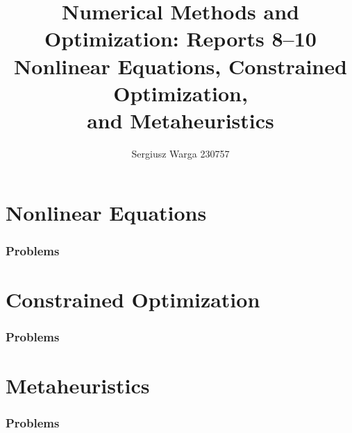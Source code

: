 \documentclass[a4paper]{article}
\title{%
  {\LARGE Numerical Methods and Optimization: Reports 8--10}\\[0.4em]
  {\large Nonlinear Equations,
    Constrained Optimization,\\
    and Metaheuristics}%
}
\author{Sergiusz Warga 230757}
\date{}
\newcommand{\labbase}{}
\begin{document}
\maketitle
\tableofcontents
\pagebreak

\part{Nonlinear Equations}

\renewcommand{\labbase}{lab8/}

\section{Problems}




\part{Constrained Optimization}

\renewcommand{\labbase}{lab9/}

\section{Problems}




\part{Metaheuristics}

\renewcommand{\labbase}{lab10/}

\section{Problems}





\clearpage

\nocite{Zdunek, GoluVanl96, Meyer, NoceWrig99}


\end{document}
